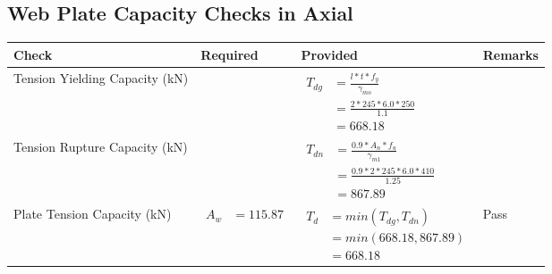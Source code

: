 \documentclass{article}%
\begin{document}
\subsection{Web Plate Capacity Checks in Axial}%
\label{subsec:WebPlateCapacityChecksinAxial}%
\renewcommand{\arraystretch}{1.2}%
\begin{longtable}{|p{4cm}|p{6cm}|p{5.5cm}|p{1.5cm}|}%
\hline%
\rowcolor{OsdagGreen}%
Check&Required&Provided&Remarks\\%
\hline%
\endhead%
\hline%
Tension Yielding Capacity (kN)&&$\begin{aligned} T_{dg} &= \frac{l*t*f_y}{\gamma_{mo}}\\ &=\frac{2*245*6.0*250}{1.1}\\ &=668.18\end{aligned}$&\\%
\hline%
Tension Rupture Capacity (kN)&&$\begin{aligned} T_{dn} &= \frac{0.9*A_{n}*f_u}{\gamma_{m1}}\\ &=\frac{0.9*2*245*6.0*410}{1.25}\\ &=867.89\end{aligned}$&\\%
\hline%
Plate Tension Capacity (kN)&$\begin{aligned} A_w &=115.87\end{aligned}$&$\begin{aligned} T_d &= min(T_{dg},T_{dn})\\ &= min(668.18,867.89)\\ &=668.18\end{aligned}$&Pass\\%
\hline%
\end{longtable}

%
\newpage%
\end{document}
